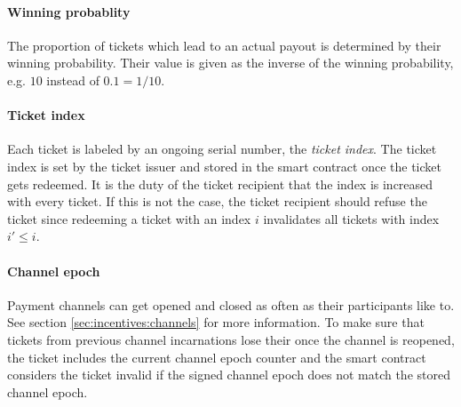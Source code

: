 \paragraph{Winning probablity}
\label{sec:tickets:issuance:winningprobability}

The proportion of tickets which lead to an actual payout is determined by their winning probability. Their value is given as the inverse of the winning probability, e.g. $10$ instead of $0.1 = 1/10$.

\paragraph{Ticket index}
\label{sec:tickets:issuance:ticketindex}

Each ticket is labeled by an ongoing serial number, the \textit{ticket index}. The ticket index is set by the ticket issuer and stored in the smart contract once the ticket gets redeemed. It is the duty of the ticket recipient that the index is increased with every ticket. If this is not the case, the ticket recipient should refuse the ticket since redeeming a ticket with an index $i$ invalidates all tickets with index $i' \le i$.

\paragraph{Channel epoch}
\label{sec:tickets:issuance:channelepoch}

Payment channels can get opened and closed as often as their participants like to. See section \ref{sec:incentives:channels} for more information. To make sure that tickets from previous channel incarnations lose their once the channel is reopened, the ticket includes the current channel epoch counter and the smart contract considers the ticket invalid if the signed channel epoch does not match the stored channel epoch.